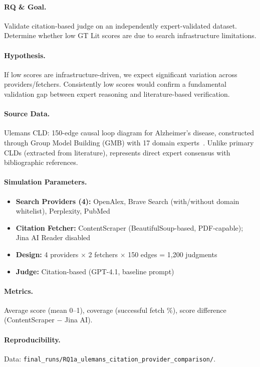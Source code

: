 \paragraph{RQ \& Goal.}
Validate citation-based judge on an independently expert-validated dataset. Determine whether low GT Lit scores are due to search infrastructure limitations.

\paragraph{Hypothesis.}
If low scores are infrastructure-driven, we expect significant variation across providers/fetchers. Consistently low scores would confirm a fundamental validation gap between expert reasoning and literature-based verification.

\paragraph{Source Data.}
Ulemans CLD: 150-edge causal loop diagram for Alzheimer's disease, constructed through Group Model Building (GMB) with 17 domain experts~\cite{uleman2024triangulation}. Unlike primary CLDs (extracted from literature), represents direct expert consensus with bibliographic references.

\paragraph{Simulation Parameters.}
\begin{itemize}[noitemsep]
    \item \textbf{Search Providers (4):} OpenAlex, Brave Search (with/without domain whitelist), Perplexity, PubMed
    \item \textbf{Citation Fetcher:} ContentScraper (BeautifulSoup-based, PDF-capable); Jina AI Reader disabled
    \item \textbf{Design:} 4 providers $\times$ 2 fetchers $\times$ 150 edges = 1,200 judgments
    \item \textbf{Judge:} Citation-based (GPT-4.1, baseline prompt)
\end{itemize}

\paragraph{Metrics.}
Average score (mean 0--1), coverage (successful fetch \%), score difference (ContentScraper $-$ Jina AI).

\paragraph{Reproducibility.}
Data: \texttt{final\_runs/RQ1a\_ulemans\_citation\_provider\_comparison/}.

